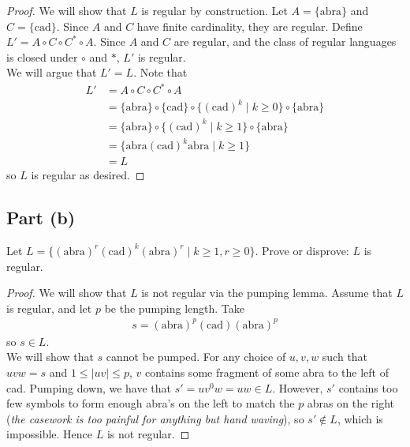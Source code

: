 \documentclass{article}
\begin{document}
\begin{proof}
    We will show that $L$ is regular by construction. Let $A = \{ \text{abra} \}$ and $C = \{ \text{cad} \}$. Since $A$ and $C$ have finite cardinality, they 
    are regular. Define $L' = A \circ C \circ C^* \circ A$. Since $A$ and $C$ are regular, and the class of regular languages is closed under $\circ$ and $*$, 
    $L'$ is regular. \\
    
    \noindent
    We will argue that $L' = L$. Note that
    \begin{align*}
        L' &= A \circ C \circ C^* \circ A \\
        &= \{ \text{abra} \} \circ \{ \text{cad} \} \circ \{ (\text{cad})^k \mid k \geq 0 \} \circ \{ \text{abra} \} \\
        &= \{ \text{abra} \} \circ \{ (\text{cad})^k \mid k \geq 1 \} \circ \{ \text{abra} \} \\
        &=  \{ \text{abra} (\text{cad})^k \text{abra} \mid k \geq 1 \} \\
        &= L
    \end{align*} 
    so $L$ is regular as desired.
\end{proof}

\subsection*{Part (b)}

Let $L = \{ (\text{abra})^r (\text{cad})^k (\text{abra})^r \mid k \geq 1, r \geq 0 \}$. Prove or disprove: $L$ is regular.

\begin{proof}
    We will show that $L$ is not regular via the pumping lemma. Assume that $L$ is regular, and let $p$ be the pumping length. Take 
    \begin{align*}
        s = (\text{abra})^p (\text{cad}) (\text{abra})^p 
    \end{align*}
    so $s \in L$. \\

    \noindent
    We will show that $s$ cannot be pumped. For any choice of $u, v, w$ such that $uvw = s$ and $1 \leq |uv| \leq p$, $v$ contains some fragment of some 
    abra to the left of cad. Pumping down, we have that $s' = uv^0w = uw \in L$. However, $s'$ contains too few symbols to form enough abra's on the left
    to match the $p$ abras on the right (\textit{the casework is too painful for anything but hand waving}), so $s' \not \in L$, which is impossible. Hence $L$
    is not regular.
\end{proof}
\end{document}
